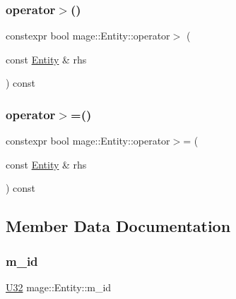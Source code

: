\mbox{\label{classmage_1_1_entity_a1c37b19e65cef365024d56224c553a60}} 
\subsubsection{\texorpdfstring{operator$>$()}{operator>()}}
{\footnotesize\ttfamily constexpr bool mage\+::\+Entity\+::operator$>$ (\begin{DoxyParamCaption}\item[{const \mbox{\hyperlink{classmage_1_1_entity}{Entity}} \&}]{rhs }\end{DoxyParamCaption}) const\hspace{0.3cm}{\ttfamily [noexcept]}}

\mbox{\label{classmage_1_1_entity_a6e7e96380255e53230ad1d180c6fc37a}} 
\subsubsection{\texorpdfstring{operator$>$=()}{operator>=()}}
{\footnotesize\ttfamily constexpr bool mage\+::\+Entity\+::operator$>$= (\begin{DoxyParamCaption}\item[{const \mbox{\hyperlink{classmage_1_1_entity}{Entity}} \&}]{rhs }\end{DoxyParamCaption}) const\hspace{0.3cm}{\ttfamily [noexcept]}}



\subsection{Member Data Documentation}
\mbox{\label{classmage_1_1_entity_a7e312e01da6d5d1e3ba7e18765bde9bc}} 
\subsubsection{\texorpdfstring{m\+\_\+id}{m\_id}}
{\footnotesize\ttfamily \mbox{\hyperlink{namespacemage_aa5d6eaabaac3cdd01873d6a3d27e90f3}{U32}} mage\+::\+Entity\+::m\+\_\+id\hspace{0.3cm}{\ttfamily [private]}}

